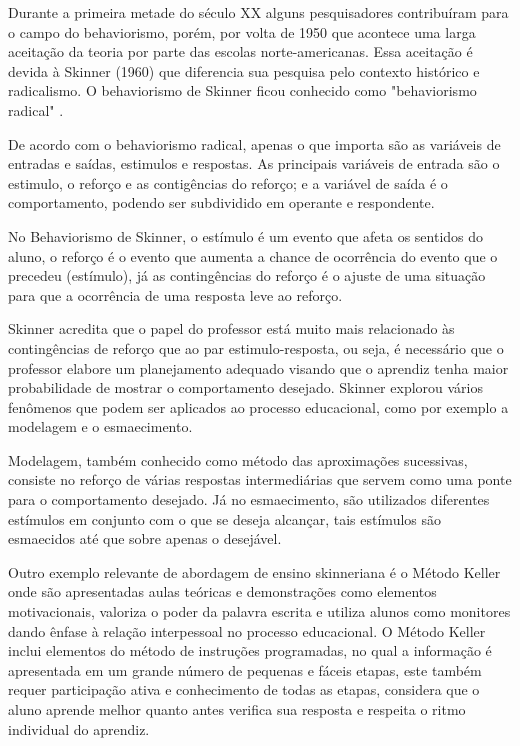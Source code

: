Durante a primeira metade do século XX alguns pesquisadores contribuíram para o campo do behaviorismo, porém, por volta de 1950 que acontece uma larga aceitação da teoria por parte das escolas norte-americanas. Essa aceitação é devida à Skinner (1960) que diferencia sua pesquisa pelo contexto histórico e radicalismo. O behaviorismo de Skinner ficou conhecido como "behaviorismo radical" \cite{fragelli2010, silva2005}.

De acordo com o behaviorismo radical, apenas o que importa são as variáveis de entradas e saídas, estimulos e respostas. As principais variáveis de entrada são o estimulo, o reforço e as contigências do reforço; e a variável de saída é o comportamento, podendo ser subdividido em operante e respondente.

No Behaviorismo de Skinner, o estímulo é um evento que afeta os sentidos do aluno, o reforço é o evento que aumenta a chance de ocorrência do evento que o precedeu (estímulo), já as contingências do reforço é o ajuste de uma situação para que a ocorrência de uma resposta leve ao reforço.

Skinner acredita que o papel do professor está muito mais relacionado às contingências de reforço que ao par estimulo-resposta, ou seja, é necessário que o professor elabore um planejamento adequado visando que o aprendiz tenha maior probabilidade de mostrar o comportamento desejado. Skinner explorou vários fenômenos que podem ser aplicados ao processo educacional, como por exemplo a modelagem e o esmaecimento.

Modelagem, também conhecido como método das aproximações sucessivas, consiste no reforço de várias respostas intermediárias que servem como uma ponte para o comportamento desejado. Já no esmaecimento, são utilizados diferentes estímulos em conjunto com o que se deseja alcançar, tais estímulos são esmaecidos até que sobre apenas o desejável.

Outro exemplo relevante de abordagem de ensino skinneriana é o Método Keller onde são apresentadas aulas teóricas e demonstrações como elementos motivacionais, valoriza o poder da palavra escrita e utiliza alunos como monitores dando ênfase à relação interpessoal no processo educacional. O Método Keller inclui elementos do método de instruções programadas, no qual a informação é apresentada em um grande número de pequenas e fáceis etapas, este também requer participação ativa e conhecimento de todas as etapas, considera que o aluno aprende melhor quanto antes verifica sua resposta e respeita o ritmo individual do aprendiz.

